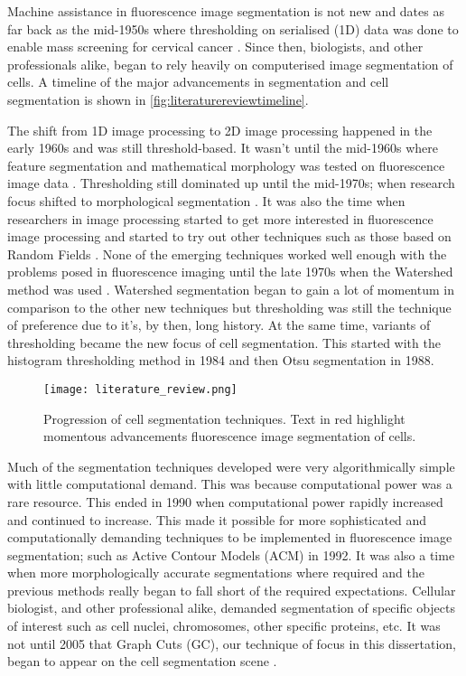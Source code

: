 \begin{definition}
	Machine assistance in fluorescence image segmentation is not new and dates as far back as the mid-1950s where thresholding on serialised (1D) data was done to enable mass screening for cervical cancer \cite{Tolles1955}. Since then, biologists, and other professionals alike, began to rely heavily on computerised image segmentation of cells.
	A timeline of the major advancements in segmentation and cell segmentation is shown in \autoref{fig:literaturereviewtimeline}.
	
	The shift from 1D image processing to 2D image processing happened in the early 1960s \cite{Prewitt1966} and was still threshold-based.
	It wasn't until the mid-1960s where feature segmentation and mathematical morphology was tested on fluorescence image data \cite{Prewitt1966,David1967}.
	Thresholding still dominated up until the mid-1970s; when research focus shifted to morphological segmentation \cite{Greipp1976}. 
	It was also the time when researchers in image processing started to get more interested in fluorescence image processing and started to try out other techniques such as those based on Random Fields \cite{Banks1975}.
	None of the emerging techniques worked well enough with the problems posed in fluorescence imaging until the late 1970s when the Watershed method was used \cite{Beucher1979}.
	Watershed segmentation began to gain a lot of momentum in comparison to the other new techniques but thresholding was still the technique of preference due to it's, by then, long history.
	At the same time, variants of thresholding became the new focus of cell segmentation. This started with the histogram thresholding method \cite{hoffman1984} in 1984 and then Otsu segmentation \citep{Geerts1988} in 1988.
	
	\begin{figure}[!t]
		\centering
		\texttt{[image: literature\_review.png]}
		\caption{Progression of cell segmentation techniques. Text in red highlight momentous advancements fluorescence image segmentation of cells.}
		\label{fig:literaturereviewtimeline}
	\end{figure}
	
	Much of the segmentation techniques developed were very algorithmically simple with little computational demand. This was because computational power was a rare resource. This ended in 1990 when computational power rapidly increased and continued to increase. This made it possible for more sophisticated and computationally demanding techniques to be implemented in fluorescence image segmentation; such as Active Contour Models (ACM) \cite{Samarabandu1992} in 1992.
	It was also a time when more morphologically accurate segmentations where required and the previous methods really began to fall short of the required expectations. Cellular biologist, and other professional alike, demanded segmentation of specific objects of interest such as cell nuclei, chromosomes, other specific proteins, etc. It was not until 2005 that Graph Cuts (GC), our technique of focus in this dissertation, began to appear on the cell segmentation scene \cite{Baggett2005}.\\
	

\end{definition}
